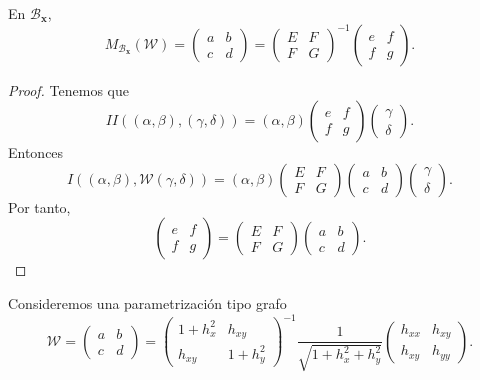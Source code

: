 \begin{prop}
En $\displaystyle \mathcal{B}_{ \textbf{x} } $, 
\[M_{ \mathcal{B}_{ \textbf{x} }}\left(\mathcal{W}\right)=\begin{pmatrix} a & b \\ c & d \end{pmatrix}=\begin{pmatrix} E & F \\ F & G \end{pmatrix}^{-1}\begin{pmatrix} e & f \\ f & g \end{pmatrix} .\]
\end{prop}
\begin{proof}
Tenemos que 
\[II\left(\left(\alpha, \beta \right), \left(\gamma, \delta \right)\right)=\left(\alpha, \beta \right)\begin{pmatrix} e & f \\ f & g \end{pmatrix}\begin{pmatrix} \gamma \\ \delta  \end{pmatrix} .\]
Entonces
\[I\left(\left(\alpha, \beta \right), \mathcal{W}\left(\gamma, \delta \right)\right)=\left(\alpha, \beta \right)\begin{pmatrix} E & F \\ F & G \end{pmatrix}\begin{pmatrix} a & b \\ c & d \end{pmatrix}\begin{pmatrix} \gamma \\ \delta  \end{pmatrix} .\]
Por tanto, 
\[\begin{pmatrix} e & f \\ f & g \end{pmatrix}=\begin{pmatrix}  E & F \\ F & G \end{pmatrix}\begin{pmatrix} a & b \\ c & d \end{pmatrix} .\]
\end{proof}

\begin{eg}
Consideremos una parametrización tipo grafo
\[\mathcal{W}=\begin{pmatrix} a & b \\ c & d \end{pmatrix}=\begin{pmatrix} 1 + h_{x}^{2} & h_{xy}\\ h_{xy} & 1 + h_{y}^{2} \end{pmatrix}^{-1}\frac{1}{\sqrt{1 + h_{x}^{2}+h_{y}^{2}}}\begin{pmatrix} h_{x x} & h_{xy} \\ h_{xy} & h_{yy} \end{pmatrix} .\]
\end{eg}
\begin{eg}
\end{eg}
